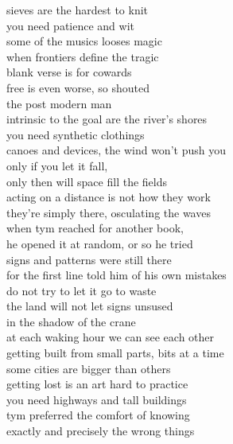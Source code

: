 sieves are the hardest to knit\\
you need patience and wit\\
some of the musics looses magic\\
when frontiers define the tragic\\
blank verse is for cowards\\
free is even worse, so shouted\\
the post modern man\\

intrinsic to the goal are the river's shores\\
you need synthetic clothings\\
canoes and devices, the wind won't push you\\
only if you let it fall,\\
only then will space fill the fields\\
acting on a distance is not how they work\\
they're simply there, osculating the waves\\

when tym reached for another book,\\
he opened it at random, or so he tried\\
signs and patterns were still there\\
for the first line told him of his own mistakes\\
do not try to let it go to waste\\
the land will not let signs unsused\\
in the shadow of the crane\\
at each waking hour we can see each other\\
getting built from small parts, bits at a time\\
some cities are bigger than others\\
getting lost is an art hard to practice\\
you need highways and tall buildings\\
tym preferred the comfort of knowing\\
exactly and precisely the wrong things
